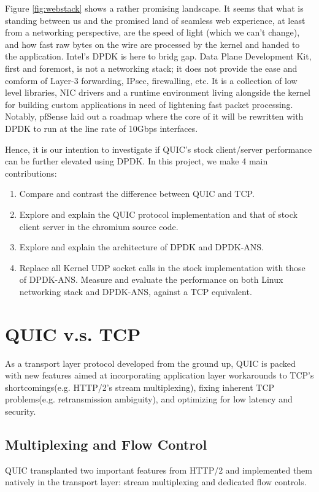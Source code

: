 \documentclass{sig-alternate-05-2015}
\begin{document}
Figure \ref{fig:webstack} shows a rather promising landscape. It seems that what is standing between us and the promised land of seamless web experience, at least from a networking perspective, are the speed of light (which we can't change), and how fast raw bytes on the wire are processed by the kernel and handed to the application. Intel's DPDK is here to bridg gap. Data Plane Development Kit, first and foremost, is not a networking stack; it does not provide the ease and comform of Layer-3 forwarding, IPsec, firewalling, etc. It is a collection of low level libraries, NIC drivers and a runtime environment living alongside the kernel for building custom applications in need of lightening fast packet processing.\cite{dpdk:home} Notably, pfSense laid out a roadmap where the core of it will be rewritten with DPDK to run at the line rate of 10Gbps interfaces. \cite{pfsense:roadmap}

Hence, it is our intention to investigate if QUIC's stock client/server performance can be further elevated using DPDK. In this project, we make 4 main contributions:

\begin{enumerate}
	\itemsep0em
	\item Compare and contrast the difference between QUIC and TCP.
	\item Explore and explain the QUIC protocol implementation and that of stock client server in the chromium source code.
	\item Explore and explain the architecture of DPDK and DPDK-ANS.
	\item Replace all Kernel UDP socket calls in the stock implementation with those of DPDK-ANS. Measure and evaluate the performance on both Linux networking stack and DPDK-ANS, against a TCP equivalent.
\end{enumerate}

\section{QUIC v.s. TCP}
As a transport layer protocol developed from the ground up, QUIC is packed with new features aimed at incorporating application layer workarounds to TCP's shortcomings(e.g. HTTP/2's stream multiplexing), fixing inherent TCP problems(e.g. retransmission ambiguity), and optimizing for low latency and security.

\subsection{Multiplexing and Flow Control}
QUIC transplanted two important features from HTTP/2 and implemented them natively in the transport layer: stream multiplexing and dedicated flow controls.
\end{document}
